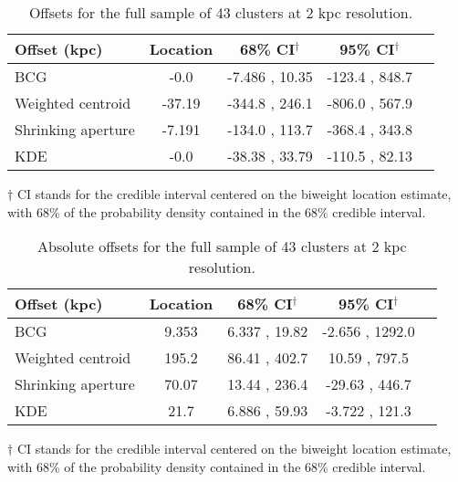 \begin{table}
\caption{Offsets for the full sample of 43 clusters at 2 kpc resolution.}
\begin{center}
\begin{tabular}{@{}lcccc}

\hline \hline Offset (kpc) & Location & 68\% CI$^\dagger$ & 95\% CI$^\dagger$ \\ \hline

BCG & -0.0 & -7.486 ,  10.35 & -123.4 , 848.7 \\
Weighted centroid & -37.19 & -344.8 ,  246.1 & -806.0 , 567.9 \\
Shrinking aperture & -7.191 & -134.0 ,  113.7 & -368.4 , 343.8 \\
KDE & -0.0 & -38.38 ,  33.79 & -110.5 , 82.13 \\
\hline
\end{tabular} 
\end{center} 
\label{tab:full2kpc_offsets}
\footnotesize{$\dagger$ CI stands for the credible interval centered on the 
	biweight location estimate, with 68\% of the probability density contained 
	in the 68\% credible interval.}\\
\end{table}
\begin{table}
\caption{Absolute offsets for the full sample of 43 clusters at 2 kpc resolution.}
\begin{center}
\begin{tabular}{@{}lcccc}

\hline \hline Offset (kpc) & Location & 68\% CI$^\dagger$ & 95\% CI$^\dagger$ \\ \hline

BCG & 9.353 & 6.337 ,  19.82 & -2.656 , 1292.0 \\
Weighted centroid & 195.2 & 86.41 ,  402.7 & 10.59 , 797.5 \\
Shrinking aperture & 70.07 & 13.44 ,  236.4 & -29.63 , 446.7 \\
KDE & 21.7 & 6.886 ,  59.93 & -3.722 , 121.3 \\
\hline
\end{tabular} 
\end{center} 
\label{tab:full_2kpc_abs_offsets}
\footnotesize{$\dagger$ CI stands for the credible interval centered on the biweight location estimate, with 68\% of the probability density contained in the 68\% credible interval.}\\
\end{table}
